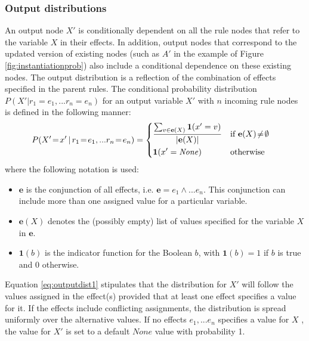 \subsubsection*{Output distributions} 

An output node $X'$ is conditionally dependent on all the rule nodes that refer to the variable $X$ in their effects.  In addition, output nodes that correspond to the updated version of existing nodes (such as $A'$ in the example of Figure \ref{fig:instantiationprob}) also include a conditional dependence on these existing nodes. The output distribution is a reflection of the combination of effects specified in the parent rules. The conditional probability distribution $P(X'|r_1\!=\!e_1,...r_n\!=\!e_n)$ for an output variable $X'$ with $n$ incoming rule nodes is defined in the following manner:
\begin{align}
&P(X'\!=\!x' \, | \, r_1\!=\!e_1,... r_n\!=\!e_n) = \begin{dcases}
\frac{\sum_{v \in {\mathbf{e}(X)}} \mathbf{1}(x' = v)} { |\mathbf{e}(X)| } & \text{if } \mathbf{e}(X)\!\neq\!\emptyset \\
\mathbf{1}(x' = \mathit{None}) & \text{otherwise}
\end{dcases}
\label{eq:outputdist1}
\end{align}
where the following notation is used: \begin{itemize}
\item $\mathbf{e}$ is the conjunction of all effects, i.e. $\mathbf{e} = e_1 \land ... e_n$.  This conjunction can include more than one assigned value for a particular variable.
\item $\mathbf{e}(X)$ denotes the (possibly empty) list of values specified for the variable $X$ in $\mathbf{e}$. 
\item $\mathbf{1}(b)$ is the indicator function for the Boolean $b$, with $\mathbf{1}(b)=1$ if $b$ is true and $0$ otherwise.
\end{itemize}

Equation \eqref{eq:outputdist1} stipulates that the distribution for $X'$ will follow the values assigned in the effect(s) provided that at least one effect specifies a value for it. If the effects include conflicting assignments, the distribution is spread uniformly over the alternative values. If no effects $e_1,...e_n$ specifies a value for $X$ , the value for $X'$ is set to a default $None$ value with probability 1. 

